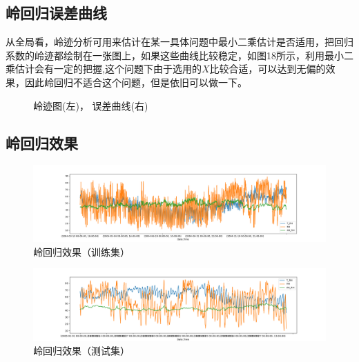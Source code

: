 \documentclass{ctexart}
\begin{document}
\subsection{岭回归误差曲线}
从全局看，岭迹分析可用来估计在某一具体问题中最小二乘估计是否适用，把回归系数的岭迹都绘制在一张图上，如果这些曲线比较稳定，如图18所示，利用最小二乘估计会有一定的把握,这个问题下由于选用的$X$比较合适，可以达到无偏的效果，因此岭回归不适合这个问题，但是依旧可以做一下。
\begin{figure}[H]
	\centering
	\caption{岭迹图(左)， 误差曲线(右)}
\end{figure}
\subsection{岭回归效果}
\begin{figure}[H]
	\includegraphics[width=1.2\textwidth]{../images/rig1.png}
	\caption{岭回归效果（训练集）}
\end{figure}
\begin{figure}[H]
	\includegraphics[width=1.2\textwidth]{../images/rig2.png}
	\caption{岭回归效果（测试集）}
\end{figure}
\end{document}
